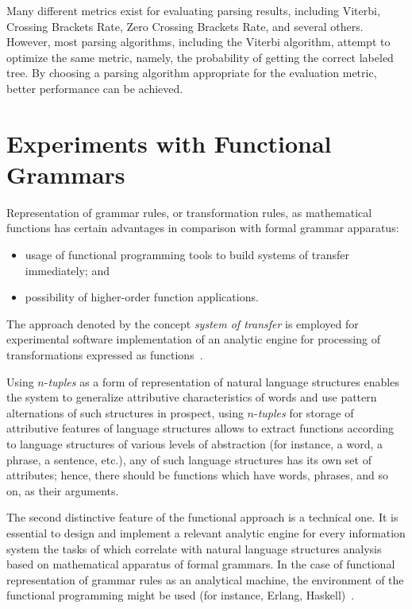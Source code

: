 \begin{multicols}{2}
     Many different metrics exist for evaluating parsing results, including Viterbi, 
Crossing Brackets Rate, Zero Crossing Brackets Rate, and several others. 
However, most parsing algorithms, including the Viterbi algorithm, attempt to 
optimize the same metric, namely, the probability of getting the correct labeled tree. 
By choosing a parsing algorithm appropriate for the evaluation metric, better 
performance can be achieved. 

\section{Experiments with Functional Grammars}
     
     \noindent
     Representation of grammar rules, or transformation rules, as mathematical 
functions has certain advantages in comparison with formal grammar apparatus:
     \begin{itemize}
     \item usage of functional programming tools to build systems of transfer 
immediately; and
     \item possibility of higher-order function applications.
     \end{itemize}
     
     The approach denoted by the concept \textit{system of transfer} is employed 
for experimental software implementation of an analytic engine for processing of 
transformations expressed as functions~\cite{16-koz}.
     
     Using $n$-\textit{tuples} as a form of representation of natural language 
structures enables the system to generalize attributive characteristics of words and 
use pattern alternations of such structures in prospect, using $n$-\textit{tuples} for 
storage of attributive features of language structures allows to extract functions 
according to language structures of various levels of abstraction (for instance, a 
word, a phrase, a sentence, etc.), any of such language structures has its own set of 
attributes; hence, there should be functions which have words, phrases, and so on, 
as their arguments.
     
     The second distinctive feature of the functional approach is a technical 
one. It is essential to design and implement a relevant analytic engine for every 
information system the tasks of which correlate with natural language structures 
analysis based on mathematical apparatus of formal grammars. In the case of 
functional representation of grammar rules as an analytical machine, the 
environment of the functional programming might be used (for instance, Erlang, 
Haskell)~\cite{17-koz}.


\end{multicols}

